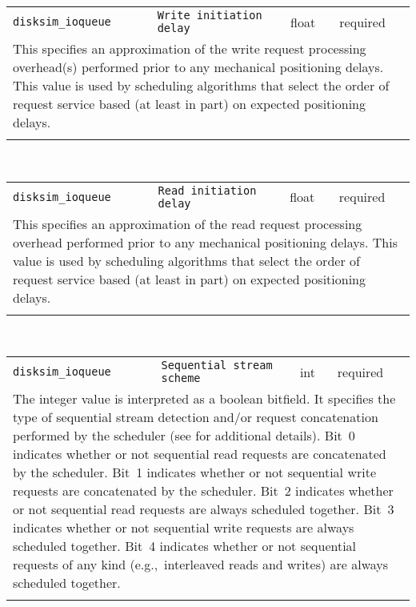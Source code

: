 \noindent 
\begin{tabular}{|p{1.5in}|p{3.5in}|p{0.5in}|p{0.5in}|}
\cline{1-4}
\texttt{disksim\_ioqueue} & \texttt{Write initiation delay} & float & required \\ 
\cline{1-4}
\multicolumn{4}{|p{6in}|}{
This specifies an approximation of the write request processing
overhead(s) performed prior to any mechanical positioning delays.
This value is used by scheduling algorithms that select the order of
request service based (at least in part) on expected positioning
delays.
}\\ 
\cline{1-4}
\multicolumn{4}{p{5in}}{}\\
\end{tabular}\\ 
\noindent 
\begin{tabular}{|p{1.5in}|p{3.5in}|p{0.5in}|p{0.5in}|}
\cline{1-4}
\texttt{disksim\_ioqueue} & \texttt{Read initiation delay} & float & required \\ 
\cline{1-4}
\multicolumn{4}{|p{6in}|}{
This specifies an approximation of the read request processing
overhead performed prior to any mechanical positioning delays. This
value is used by scheduling algorithms that select the order of
request service based (at least in part) on expected positioning
delays.
}\\ 
\cline{1-4}
\multicolumn{4}{p{5in}}{}\\
\end{tabular}\\ 
\noindent 
\begin{tabular}{|p{1.5in}|p{3.5in}|p{0.5in}|p{0.5in}|}
\cline{1-4}
\texttt{disksim\_ioqueue} & \texttt{Sequential stream scheme} & int & required \\ 
\cline{1-4}
\multicolumn{4}{|p{6in}|}{
The integer value is interpreted as a boolean bitfield. It specifies
the type of sequential stream detection and/or request concatenation
performed by the scheduler (see \cite{Worthington95a} for additional
details).
Bit~0 indicates whether or not sequential read requests are
concatenated by the scheduler.
Bit~1 indicates whether or not sequential write requests are
concatenated by the scheduler.
Bit~2 indicates whether or not sequential read requests are always
scheduled together.
Bit~3 indicates whether or not sequential write requests are always
scheduled together.
Bit~4 indicates whether or not sequential requests of any kind
(e.g.,~interleaved reads and writes) are always scheduled together.
}\\ 
\cline{1-4}
\multicolumn{4}{p{5in}}{}\\
\end{tabular}\\ 
